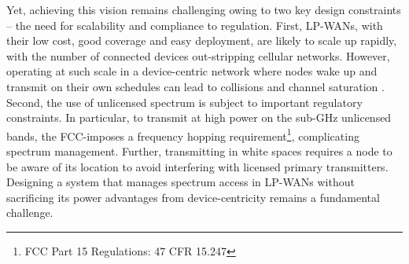 Yet, achieving this vision remains challenging owing to two key design constraints -- the need for scalability and compliance to regulation. First, LP-WANs, with their low cost, good coverage and easy deployment, are likely to scale up rapidly, with the number of connected devices out-stripping cellular networks. However, operating at such scale in a device-centric network where nodes wake up and transmit on their own schedules can lead to collisions and channel saturation \cite{Abramson1970}. Second, the use of unlicensed spectrum is subject to important regulatory constraints. In particular, to transmit at high power on the sub-GHz unlicensed bands, the FCC-imposes a frequency hopping requirement\footnote{FCC Part 15 Regulations: 47 CFR 15.247}, complicating spectrum management. Further, transmitting in white spaces requires a node to be aware of its location to avoid interfering with licensed primary transmitters. Designing a system that manages spectrum access in LP-WANs without sacrificing its power advantages from device-centricity remains a fundamental challenge. 









